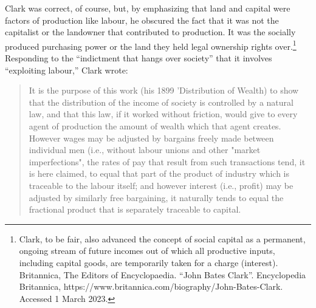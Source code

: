  Clark was correct, of course, but, by emphasizing that land and capital were factors of production like labour, he obscured the fact  that it was not the capitalist or the landowner that contributed  to production. It was the socially produced purchasing power or the land they held legal ownership rights over.\footnote{Clark, to be fair, also advanced the concept of social capital as a permanent, ongoing stream of future incomes out of which all productive inputs, including capital goods, are temporarily taken for a charge (interest). Britannica, The Editors of Encyclopaedia. ``John Bates Clark''. Encyclopedia Britannica, https://www.britannica.com/biography/John-Bates-Clark. Accessed 1 March 2023.}  Responding to the ``indictment that hangs over society'' that it involves ``exploiting labour,'' Clark wrote:
    \begin{quotation}
        It is the purpose of this work (his 1899 'Distribution of Wealth) to show that the distribution of the income of society is controlled by a natural law, and that this law, if it worked without friction, would give to every agent of production the amount of wealth which that agent creates. However wages may be adjusted by bargains freely made between individual men (i.e., without labour unions and other "market imperfections", the rates of pay that result from such transactions tend, it is here claimed, to equal that part of the product of industry which is traceable to the labour itself; and however interest (i.e., profit) may be adjusted by similarly free bargaining, it naturally tends to equal the fractional product that is separately traceable to capital. 
  \end{quotation}
  
